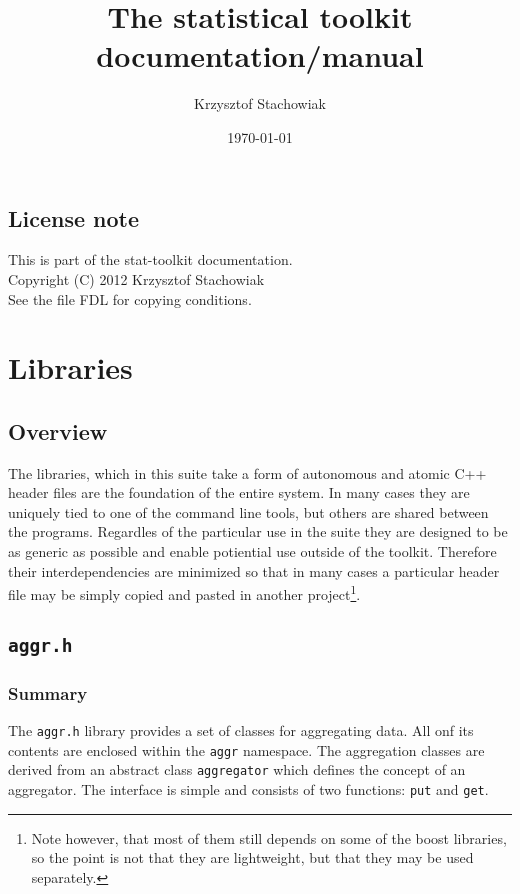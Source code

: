 \documentclass{report}
\begin{document}
\title{The statistical toolkit documentation/manual}
\author{Krzysztof Stachowiak}
\date{\today}

\maketitle

\tableofcontents

\section*{License note}
This is part of the stat-toolkit documentation.\\
Copyright (C) 2012 Krzysztof Stachowiak\\
See the file FDL for copying conditions.

\chapter{Libraries}

\section{Overview}
The libraries, which in this suite take a form of autonomous and atomic C++
header files are the foundation of the entire system. In many cases they are
uniquely tied to one of the command line tools, but others are shared between
the programs. Regardles of the particular use in the suite they are designed to
be as generic as possible and enable potiential use outside of the toolkit.
Therefore their interdependencies are minimized so that in many cases a
particular header file may be simply copied and pasted in another
project\footnote{Note however, that most of them still depends on some of the boost
libraries, so the point is not that they are lightweight, but that they may be
used separately.}.

\section{\texttt{aggr.h}}

	\subsection{Summary}
	The \texttt{aggr.h} library provides a set of classes for aggregating data.
	All onf its contents are enclosed within the \texttt{aggr} namespace. The
	aggregation classes are derived from an abstract class \texttt{aggregator}
	which defines the concept of an aggregator. The interface is simple and
	consists of two functions: \texttt{put} and \texttt{get}.
\end{document}
